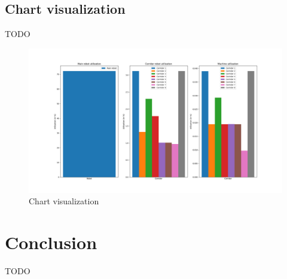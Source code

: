 \documentclass{article}
\begin{document}
    \subsection{Chart visualization}
    TODO

    \begin{figure}
        \includegraphics[width=\textwidth]{../../screenshots/pyplot.png}
        \caption{Chart visualization}
    \end{figure}

    \section{Conclusion}
    \label{sec:con}
    TODO~\cite{key}

    
    
\end{document}
